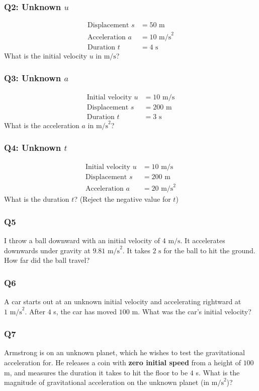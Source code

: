 \documentclass{article}
\begin{document}
\subsubsection{Q2: Unknown $u$}
\begin{align}
\text{Displacement } s&=50 \text{ m}\\
\text{Acceleration }a&=10 \text{ m/s}^2\\
\text{Duration }t&=4 \text{ s}
\end{align}
What is the initial velocity $u$ in $\text{m/s}$?
\subsubsection{Q3: Unknown $a$}
\begin{align}
\text{Initial velocity } u&=10 \text{ m/s}\\
\text{Displacement }s&=200 \text{ m}\\
\text{Duration }t&=3 \text{ s}
\end{align}
What is the acceleration $a$ in $\text{m/s}^2$?
\subsubsection{Q4: Unknown $t$}
\begin{align}
\text{Initial velocity } u&=10 \text{ m/s}\\
\text{Displacement }s&=200 \text{ m}\\
\text{Acceleration }a&=20 \text{ m/s}^2
\end{align}
What is the duration $t$? (Reject the negative value for $t$)
\subsubsection{Q5}
I throw a ball downward with an initial velocity of $4 \text{ m/s}$. It accelerates downwards under gravity at $9.81 \text{ m/s}^2$. It takes $2 \text{ s}$ for the ball to hit the ground. How far did the ball travel? 
\subsubsection{Q6}
A car starts out at an unknown initial velocity and accelerating rightward at $1 \text{ m/s}^2$. After $4$ s, the car has moved $100$ m. What was the car's initial velocity? 
\subsubsection{Q7}
Armstrong is on an unknown planet, which he wishes to test the gravitational acceleration for. He releases a coin with \textbf{zero initial speed} from a height of $100$ m, and measures the duration it takes to hit the floor to be $4$ s. What is the magnitude of gravitational acceleration on the unknown planet (in $\text{m/s}^2$)?
\end{document}

